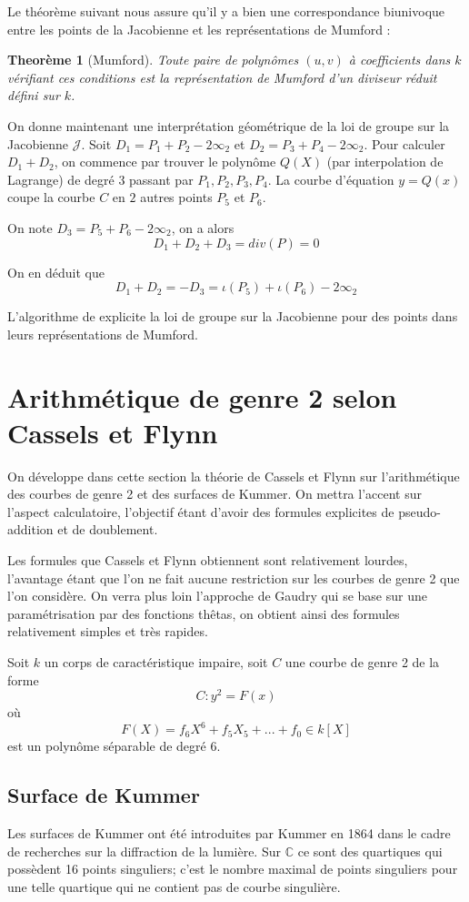 \documentclass[a4paper,12pt]{article}
\newtheorem{theoreme}{Theorème}[section]
\theoremstyle{definition}
\theoremstyle{remark}
\numberwithin{equation}{section}
\begin{document}
Le théorème suivant nous assure qu'il y a bien une correspondance biunivoque entre les points de la Jacobienne et les représentations de Mumford :

\begin{theoreme}[Mumford]
Toute paire de polynômes $(u,v)$ à coefficients dans $k$ vérifiant ces conditions est la représentation de Mumford d'un diviseur réduit défini sur $k$.
\end{theoreme}

On donne maintenant une interprétation géométrique de la loi de groupe sur la Jacobienne $\mathcal{J}$. Soit $D_1 = P_1 + P_2 - 2\infty_2$ et $D_2 = P_3 + P_4 - 2\infty_2$. Pour calculer $D_1 + D_2$, on commence par trouver le polynôme $Q(X)$ (par interpolation de Lagrange) de degré $3$ passant par $P_1,P_2,P_3,P_4$. La courbe d'équation $y = Q(x)$ coupe la courbe $C$ en $2$ autres points $P_5$ et $P_6$.

On note $D_3 = P_5 + P_6 - 2\infty_2$, on a alors
$$D_1 + D_2 + D_3 = div(P) = 0$$

On en déduit que
$$D_1 + D_2 = -D_3 = \iota(P_5) + \iota(P_6) - 2\infty_2$$

L'algorithme de \citet{cantor} explicite la loi de groupe sur la Jacobienne pour des points dans leurs représentations de Mumford.

\section{Arithmétique de genre 2 selon Cassels et Flynn}
On développe dans cette section la théorie de Cassels et Flynn sur l'arithmétique des courbes de genre 2 et des surfaces de Kummer. On mettra l'accent sur l'aspect calculatoire, l'objectif étant d'avoir des formules explicites de pseudo-addition et de doublement.

Les formules que Cassels et Flynn obtiennent sont relativement lourdes, l'avantage étant que l'on ne fait aucune restriction sur les courbes de genre 2 que l'on considère. On verra plus loin l'approche de Gaudry qui se base sur une paramétrisation par des fonctions thêtas, on obtient ainsi des formules relativement simples et très rapides.

Soit $k$ un corps de caractéristique impaire, soit $C$ une courbe de genre 2 de la forme
$$C : y^2 = F(x)$$
où $$F(X) = f_6X^6 + f_5X_5 + ... + f_0 \in k[X]$$
est un polynôme séparable de degré 6.

\subsection{Surface de Kummer}
Les surfaces de Kummer ont été introduites par Kummer en 1864 dans le cadre de recherches sur la diffraction de la lumière. Sur $\mathbb{C}$ ce sont des quartiques qui possèdent 16 points singuliers; c'est le nombre maximal de points singuliers pour une telle quartique qui ne contient pas de courbe singulière.
\end{document}
